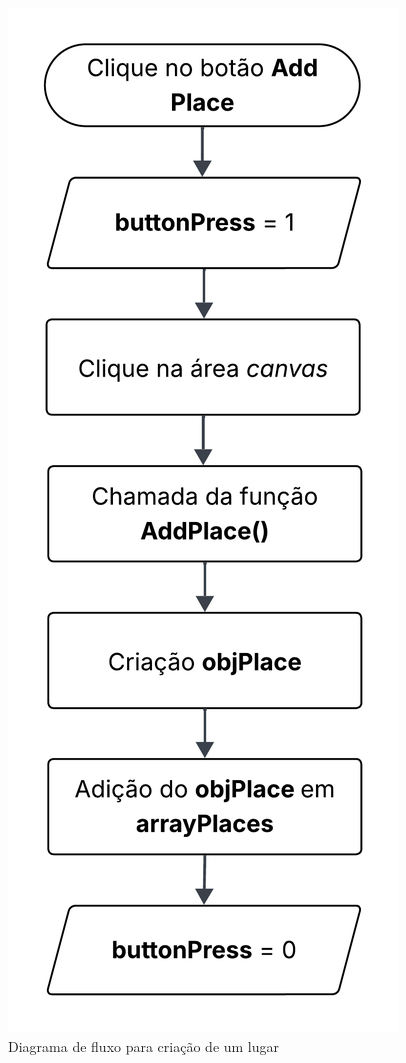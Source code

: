 \documentclass[
	12pt,				%
	openright,			%
	oneside,			%
	a4paper,			%
	english,			%
	brazil				%
	]{abntex2}
\theoremstyle{doispontos}
\begin{document}
\begin{figure}[ht] 
	\centering
	\includegraphics[scale=0.2]{figuras/diagrama-fluxo-addPlace.png}
	\caption[Diagrama de fluxo para criação de um lugar]{Diagrama de fluxo para criação de um lugar}
	\label{fig:addPlaceDiagram}
\end{figure}
\FloatBarrier
\end{document}
